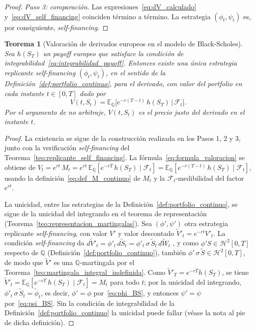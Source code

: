 \documentclass[11pt,a4paper,oneside]{report}
\theoremstyle{plain}
\newtheorem{teorema}{Teorema}[chapter]
\theoremstyle{definition}
\theoremstyle{remark}
\newcommand{\E}{\mathbb{E}}
\newcommand{\Q}{\mathbb{Q}}
\newcommand{\F}{\mathcal{F}}
\newcommand{\1}{\mathbf{1}}
\begin{document}
\begin{proof}
\emph{Paso 3: comparación.} Las
expresiones~\eqref{eq:dV_calculado} y~\eqref{eq:dV_self_financing}
coinciden término a término. La estrategia $(\phi_t, \psi_t)$ es,
por consiguiente, \emph{self-financing}.
\end{proof}

\begin{teorema}[Valoración de derivados europeos en el modelo de Black-Scholes]
\label{teo:valoracion_BS}
Sea $h(S_T)$ un \emph{payoff} europeo que satisface la condición de
integrabilidad~\eqref{eq:integrabilidad_payoff}. Entonces existe una
única estrategia replicante \emph{self-financing} $(\phi_t, \psi_t)$, en el sentido de la Definición~\ref{def:portfolio_continuo},
para el derivado, con valor del portfolio en cada instante $t \in [0, T]$
dado por
\begin{equation}\label{eq:formula_valoracion}
  \boxed{\;
    V(t, S_t) = \E_\Q\!\bigl[e^{-r(T - t)}\, h(S_T) \,\big|\, \F_t\bigr]. \;}
\end{equation}
Por el argumento de no arbitraje, $V(t, S_t)$ es el precio justo del
derivado en el instante $t$.
\end{teorema}

\begin{proof}
La existencia se sigue de la construcción realizada en los Pasos 1, 2
y 3, junto con la verificación
\emph{self-financing} del Teorema~\ref{teo:replicante_self_financing}.
La fórmula~\eqref{eq:formula_valoracion} se obtiene de
$V_t = e^{rt}\, M_t = e^{rt}\, \E_\Q[e^{-rT}\, h(S_T) \mid \F_t]
= \E_\Q[e^{-r(T-t)}\, h(S_T) \mid \F_t]$, usando la
definición~\eqref{eq:def_M_continuo} de $M_t$ y la $\F_t$-medibilidad
del factor $e^{rt}$.

La unicidad, entre las estrategias de la Definición~\ref{def:portfolio_continuo}, se sigue de la unicidad del integrando en el teorema de representación (Teorema~\ref{teo:representacion_martingalas}). Sea $(\phi', \psi')$ otra estrategia replicante \emph{self-financing}, con valor $V'$ y valor descontado $\widetilde V'_t = e^{-rt} V'_t$. La condición \emph{self-financing} da $d\widetilde V'_t = \phi'_t\, d\widetilde S_t = \phi'_t\, \sigma\, \widetilde S_t\, d\widetilde W_t$ \cite[Lema~5.1.3]{etheridge}, y como $\phi' S \in \mathcal{H}^2[0, T]$ respecto de $\Q$ (Definición~\ref{def:portfolio_continuo}), también $\phi'\, \sigma\, \widetilde S \in \mathcal{H}^2[0, T]$, de modo que $\widetilde V'$ es una $\Q$-martingala por el Teorema~\ref{teo:martingala_integral_indefinida}. Como $\widetilde V'_T = e^{-rT} h(S_T)$, se tiene $\widetilde V'_t = \E_\Q[e^{-rT}\, h(S_T) \mid \F_t] = M_t$ para todo $t$; por la unicidad del integrando, $\phi'_t\, \sigma\, \widetilde S_t = \widetilde\phi_t$, es decir, $\phi' = \phi$ por~\eqref{eq:phi_BS}, y entonces $\psi' = \psi$ por~\eqref{eq:psi_BS}. Sin la condición de integrabilidad de la Definición~\ref{def:portfolio_continuo} la unicidad puede fallar (véase la nota al pie de dicha definición).
\end{proof}
\end{document}
